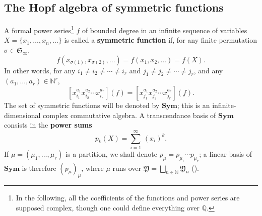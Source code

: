\documentclass[smallextended,nospthms]{svjour3}
\theoremstyle{remark}
\newcommand{\N}{\mathbb{N}}
\newcommand{\Q}{\mathbb{Q}}
\newcommand{\sym}{\mathfrak{S}}
\newcommand{\Sym}{\mathbf{Sym}}
\newcommand{\ym}{\mathfrak{Y}}
\begin{document}
\subsection{The Hopf algebra of symmetric functions}\label{symfunc}
A formal power series\footnote{In the following, all the coefficients of the functions and power series are supposed complex, though one could define everything over $\Q$.} $f$ of bounded degree in an infinite sequence of variables $X=\{x_{1},\ldots,x_{n},\ldots\}$ is called a \textbf{symmetric function} if, for any finite permutation $\sigma \in \sym_{\infty}$, 
$$f(x_{\sigma(1)},x_{\sigma(2)},\ldots)=f(x_{1},x_{2},\ldots)=f(X).$$
In other words, for any $i_{1}\neq i_{2}\neq \cdots \neq i_{r}$ and $j_{1}\neq j_{2}\neq \cdots \neq j_{r}$, and any $(a_{1},\ldots,a_{r})\in \N^{r}$,
$$[x_{i_{1}}^{a_{1}}x_{i_{2}}^{a_{2}}\cdots x_{i_{r}}^{a_{r}}](f)=[x_{j_{1}}^{a_{1}}x_{j_{2}}^{a_{2}}\cdots x_{j_{r}}^{a_{r}}](f).$$
The set of symmetric functions will be denoted by $\Sym$; this is an infinite-dimensional complex commutative algebra. A transcendance basis of $\Sym$ consists in the \textbf{power sums}
$$p_{k}(X)=\sum_{i=1}^{\infty} \,(x_{i})^{k}.$$
If $\mu=(\mu_{1},\ldots,\mu_{r})$ is a partition, we shall denote $p_{\mu}=p_{\mu_{1}}\cdots p_{\mu_{r}}$; a linear basis of $\Sym$ is therefore $(p_{\mu})_{\mu}$, where $\mu$ runs over $\ym=\bigsqcup_{n \in \N}\ym_{n}$ (\cite[\S1.2]{Mac95}).\bigskip
\end{document}
